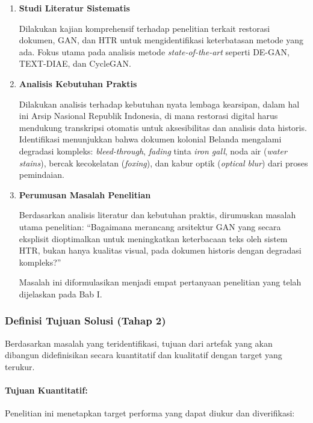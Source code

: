 \documentclass[12pt,a4paper]{article}
\begin{document}
\begin{enumerate}[label=\arabic*., leftmargin=*, nosep]
\item \textbf{Studi Literatur Sistematis}

Dilakukan kajian komprehensif terhadap penelitian terkait restorasi dokumen, GAN, dan HTR untuk mengidentifikasi keterbatasan metode yang ada. Fokus utama pada analisis metode \textit{state-of-the-art} seperti DE-GAN, TEXT-DIAE, dan CycleGAN.

\item \textbf{Analisis Kebutuhan Praktis}

Dilakukan analisis terhadap kebutuhan nyata lembaga kearsipan, dalam hal ini Arsip Nasional Republik Indonesia, di mana restorasi digital harus mendukung transkripsi otomatis untuk aksesibilitas dan analisis data historis. Identifikasi menunjukkan bahwa dokumen kolonial Belanda mengalami degradasi kompleks: \textit{bleed-through}, \textit{fading} tinta \textit{iron gall}, noda air (\textit{water stains}), bercak kecokelatan (\textit{foxing}), dan kabur optik (\textit{optical blur}) dari proses pemindaian.

\item \textbf{Perumusan Masalah Penelitian}

Berdasarkan analisis literatur dan kebutuhan praktis, dirumuskan masalah utama penelitian: ``Bagaimana merancang arsitektur GAN yang secara eksplisit dioptimalkan untuk meningkatkan keterbacaan teks oleh sistem HTR, bukan hanya kualitas visual, pada dokumen historis dengan degradasi kompleks?''

Masalah ini diformulasikan menjadi empat pertanyaan penelitian yang telah dijelaskan pada Bab I.
\end{enumerate}

\subsubsection{Definisi Tujuan Solusi (Tahap 2)}
Berdasarkan masalah yang teridentifikasi, tujuan dari artefak yang akan dibangun didefinisikan secara kuantitatif dan kualitatif dengan target yang terukur.

\paragraph{Tujuan Kuantitatif:}

Penelitian ini menetapkan target performa yang dapat diukur dan diverifikasi:
\end{document}
